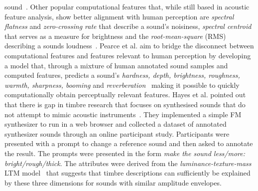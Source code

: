 \documentclass[]{interact}
\theoremstyle{plain}%
\theoremstyle{definition}
\theoremstyle{remark}
\begin{document}
sound~\cite{siedenburgComparisonApproachesTimbre2016}. Other popular computational features that, while still based in acoustic feature analysis, show better alignment with human perception are \textit{spectral flatness} and \textit{zero-crossing rate} that describe a sound's noisiness, \textit{spectral centroid} that serves as a measure for brightness and the \textit{root-mean-square} (RMS) describing a sounds loudness~\cite{peeters2004large,cite_libros_website?}. Pearce et al. aim to bridge the disconnect between computational features and features relevant to human perception by developing a model that, through a mixture of human annotated sound samples and computed features, predicts a sound's \textit{hardness, depth, brightness, roughness, warmth, sharpness, booming} and \textit{reverberation}~\cite{pearceModellingTimbralHardness2019} making it possible to quickly computationally obtain perceptually relevant features.   
Hayes et al. pointed out that there is gap in timbre research that focuses on synthesised sounds that do not attempt to mimic acoustic instruments~\cite{hayes_new_journal_paper}. They implemented a simple FM synthesizer to run in a web browser and collected a dataset of annotated synthesizer sounds through an online participant study. Participants were presented with a prompt to change a reference sound and then asked to annotate the result. The prompts were presented in the form \textit{make the sound less/more: bright/rough/thick}. The attributes were derived from the \textit{luminance-texture-mass} LTM model~\cite{zacharakis} that suggests that timbre descriptions can sufficiently be explained by these three dimensions for sounds with similar amplitude envelopes.
\end{document}
